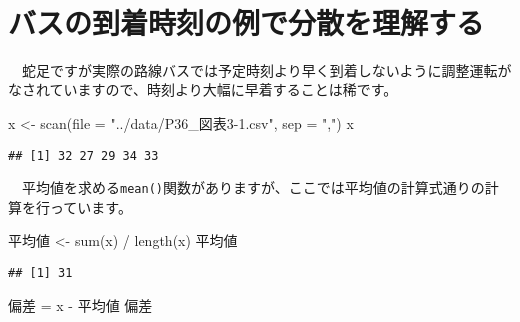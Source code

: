 \documentclass[
  12pt,
]{book}
\newenvironment{Shaded}{\begin{snugshade}}{\end{snugshade}}
\newcommand{\AttributeTok}[1]{\textcolor[rgb]{0.77,0.63,0.00}{#1}}
\newcommand{\FunctionTok}[1]{\textcolor[rgb]{0.00,0.00,0.00}{#1}}
\newcommand{\NormalTok}[1]{#1}
\newcommand{\OtherTok}[1]{\textcolor[rgb]{0.56,0.35,0.01}{#1}}
\newcommand{\SpecialCharTok}[1]{\textcolor[rgb]{0.00,0.00,0.00}{#1}}
\newcommand{\StringTok}[1]{\textcolor[rgb]{0.31,0.60,0.02}{#1}}
\begin{document}
　

\hypertarget{ux30d0ux30b9ux306eux5230ux7740ux6642ux523bux306eux4f8bux3067ux5206ux6563ux3092ux7406ux89e3ux3059ux308b}{%
\section{バスの到着時刻の例で分散を理解する}\label{ux30d0ux30b9ux306eux5230ux7740ux6642ux523bux306eux4f8bux3067ux5206ux6563ux3092ux7406ux89e3ux3059ux308b}}

　蛇足ですが実際の路線バスでは予定時刻より早く到着しないように調整運転がなされていますので、時刻より大幅に早着することは稀です。

\begin{Shaded}
\begin{Highlighting}[]
\NormalTok{x }\OtherTok{\textless{}{-}} \FunctionTok{scan}\NormalTok{(}\AttributeTok{file =} \StringTok{"../data/P36\_図表3{-}1.csv"}\NormalTok{, }\AttributeTok{sep =} \StringTok{","}\NormalTok{)}
\NormalTok{x}
\end{Highlighting}
\end{Shaded}

\begin{verbatim}
## [1] 32 27 29 34 33
\end{verbatim}

　平均値を求める\texttt{mean()}関数がありますが、ここでは平均値の計算式通りの計算を行っています。

\begin{Shaded}
\begin{Highlighting}[]
\StringTok{\textasciigrave{}}\AttributeTok{平均値}\StringTok{\textasciigrave{}} \OtherTok{\textless{}{-}} \FunctionTok{sum}\NormalTok{(x) }\SpecialCharTok{/} \FunctionTok{length}\NormalTok{(x)}
\StringTok{\textasciigrave{}}\AttributeTok{平均値}\StringTok{\textasciigrave{}}
\end{Highlighting}
\end{Shaded}

\begin{verbatim}
## [1] 31
\end{verbatim}

\begin{Shaded}
\begin{Highlighting}[]
\StringTok{\textasciigrave{}}\AttributeTok{偏差}\StringTok{\textasciigrave{}} \OtherTok{=}\NormalTok{ x }\SpecialCharTok{{-}} \StringTok{\textasciigrave{}}\AttributeTok{平均値}\StringTok{\textasciigrave{}}
\StringTok{\textasciigrave{}}\AttributeTok{偏差}\StringTok{\textasciigrave{}}
\end{Highlighting}
\end{Shaded}
\end{document}
